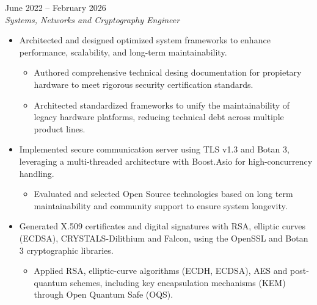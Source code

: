 \documentclass[11pt,a4paper]{article}
\newenvironment{job}[3]{%
  \vspace{0.55em}%
  \noindent{\bfseries #1}\hfill{\color{cvaccent}#2}\\[0.1em]
  \textit{#3}\par
  \begin{itemize}
}{%
  \end{itemize}
}
\begin{document}
\begin{job}{Epicom S.A.}{June 2022 -- February 2026}{Systems, Networks and Cryptography Engineer}
\begin{itemize}
    \item Resolved technical blockers during the device certification process, ensuring compliance with industry security standards.
    \item Implemented advanced routing protocols using the FRR suite on embedded systems.
    \item Developed Linux kernel drivers and customized Device Tree Sources (DTS) to enable SFP hot-plug support across I2C, phylink and gianfar drivers.
    \item Developed and integrated SPI-NOR peripheral drivers for persistend data storage on embedded platforms.
    \item Implemented custon \texttt{/proc} file system interfaces to manage and access persistent configuration data from user-space.
    \item Future-proofed legacy systems by resolving Y2038 (Unix Epoch) compliance issues, spearheading the glibc migration from 2.28 to 2.40.
  \end{itemize}
  \item Architected and designed optimized system frameworks to enhance performance, scalability, and long-term maintainability.
  \begin{itemize}
    \item Authored comprehensive technical desing documentation for propietary hardware to meet rigorous security certification standards.
    \item Architected standardized frameworks to unify the maintainability of legacy hardware platforms, reducing technical debt across multiple product lines.
  \end{itemize}
  \item Implemented secure communication server using TLS v1.3 and Botan 3, leveraging a multi-threaded architecture with Boost.Asio for high-concurrency handling.
  \begin{itemize}
    \item Evaluated and selected Open Source technologies based on long term maintainability and community support to ensure system longevity.
  \end{itemize}
  \item Generated X.509 certificates and digital signatures with RSA, elliptic curves (ECDSA), CRYSTALS-Dilithium and Falcon, using the OpenSSL and Botan 3 cryptographic libraries.
  \begin{itemize}
    \item Applied RSA, elliptic-curve algorithms (ECDH, ECDSA), AES and post-quantum schemes, including key encapsulation mechanisms (KEM) through Open Quantum Safe (OQS).

\end{itemize}
\end{job}
\end{document}
